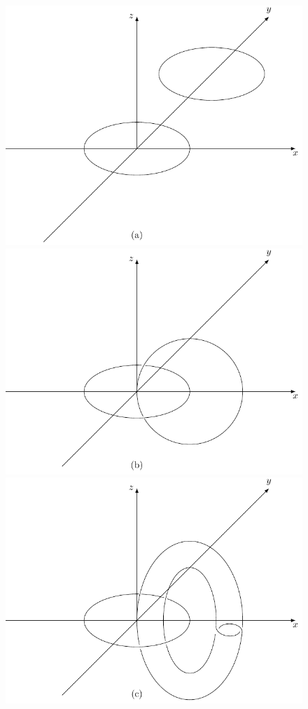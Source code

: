 \begin{figure}[!htb]
    \centering
    \includegraphics[width=.65\linewidth]{./pics/Fig4-6-(a).pdf}
    
    \includegraphics[width=.65\linewidth]{./pics/Fig4-6-(b).pdf}
    
    \includegraphics[width=.65\linewidth]{./pics/Fig4-6-(c).pdf}
    \caption{}
    \label{Fig 4-6}
\end{figure}